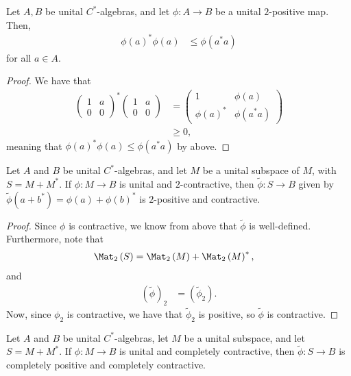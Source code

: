 \documentclass[10pt]{mypackage}
\begin{document}
\begin{proposition}
  Let $A,B$ be unital $C^{\ast}$-algebras, and let $\phi\colon A\rightarrow B$ be a unital $2$-positive map. Then,
  \begin{align*}
    \phi(a)^{\ast}\phi(a) &\leq \phi\left( a^{\ast}a \right)
  \end{align*}
  for all $a\in A$.
\end{proposition}
\begin{proof}
  We have that
  \begin{align*}
    \begin{pmatrix}1 & a \\ 0 & 0\end{pmatrix}^{\ast} \begin{pmatrix}1 & a \\ 0 & 0\end{pmatrix} &= \begin{pmatrix}1 & \phi(a) \\ \phi(a)^{\ast} & \phi\left( a^{\ast}a \right)\end{pmatrix}\\
                     &\geq 0,
  \end{align*}
  meaning that $\phi(a)^{\ast}\phi(a)\leq \phi\left( a^{\ast}a \right)$ by above.
\end{proof}
\begin{proposition}
  Let $A$ and $B$ be unital $C^{\ast}$-algebras, and let $M$ be a unital subspace of $M$, with $S = M + M^{\ast}$. If $\phi\colon M\rightarrow B$ is unital and $2$-contractive, then $\widetilde{\phi}\colon S\rightarrow B$ given by $\widetilde{\phi}\left( a + b^{\ast} \right) = \phi(a) + \phi(b)^{\ast}$ is $2$-positive and contractive.
\end{proposition}
\begin{proof}
  Since $\phi$ is contractive, we know from above that $\widetilde{\phi}$ is well-defined. Furthermore, note that
  \begin{align*}
    \Mat_2\left( S \right) &= \Mat_2\left( M \right) + \Mat_2\left( M \right)^{\ast},
  \end{align*}
  and
  \begin{align*}
    \left( \widetilde{\phi} \right)_2 &= \left( \widetilde{\phi}_2 \right).
  \end{align*}
  Now, since $\phi_2$ is contractive, we have that $\widetilde{\phi}_2$ is positive, so $\widetilde{\phi}$ is contractive.
\end{proof}
\begin{proposition}
  Let $A$ and $B$ be unital $C^{\ast}$-algebras, let $M$ be a unital subspace, and let $S = M + M^{\ast}$. If $\phi\colon M\rightarrow B$ is unital and completely contractive, then $\widetilde{\phi}\colon S\rightarrow B$ is completely positive and completely contractive.
\end{proposition}
\end{document}
